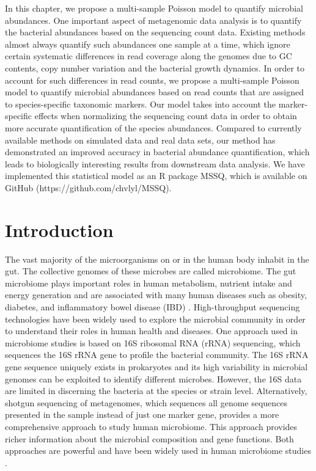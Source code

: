  \label{chpt3:MSSQ}

In this chapter, we propose a multi-sample Poisson model to quantify microbial abundances. One important aspect of metagenomic data analysis is to quantify the bacterial abundances based on the sequencing count data. Existing methods almost always quantify such abundances one sample at a time, which ignore certain systematic differences in read coverage along the genomes due to GC contents, copy number variation and the bacterial growth dynamics. In order to account for such differences in read counts, we propose a multi-sample Poisson model to quantify microbial abundances based on read counts that are assigned to species-specific taxonomic markers. Our model takes into account the marker-specific effects when normalizing the sequencing count data in order to obtain more accurate quantification of the species abundances. Compared to currently available methods on simulated data and real data sets, our method has demonstrated an improved accuracy in bacterial abundance quantification, which leads to biologically interesting results from downstream data analysis. We have implemented this statistical model as an R package MSSQ, which is available on GitHub (https://github.com/chvlyl/MSSQ).


\section{Introduction}
The vast majority of the microorganisms on or in the human body inhabit in the gut. The collective genomes of these microbes are called microbiome. The gut microbiome plays important roles in human metabolism, nutrient intake and energy generation and are associated with many human diseases such as obesity, diabetes, and inflammatory bowel disease (IBD) \citep{Cox:2014hy, lewis2015inflammation, Cho:2012cn}. High-throughput sequencing technologies have been widely used to explore the microbial community in order to understand their roles in human health and diseases. One approach used in microbiome studies is based on 16S ribosomal RNA (rRNA) sequencing, which sequences the 16S rRNA gene to profile the bacterial community. The 16S rRNA gene sequence uniquely exists in prokaryotes and its high variability in microbial genomes can be exploited to identify different microbes. However, the 16S data are limited in discerning the bacteria at the species or strain level. Alternatively, shotgun sequencing of metagenomes, which sequences all genome sequences presented in the sample instead of just one marker gene, provides a more comprehensive approach to study human microbiome. This approach provides richer information about the microbial composition and gene functions. Both approaches are powerful and have been widely used in human microbiome studies \citep{turnbaugh2007human, qin2010human}.


